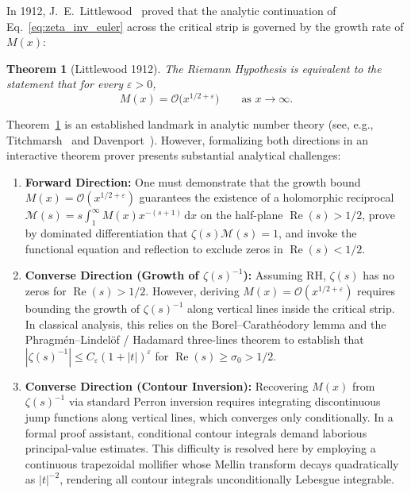 \documentclass[11pt,a4paper]{article}
\newtheorem{theorem}{Theorem}[section]
\theoremstyle{definition}
\newcommand{\dee}{\mathrm{d}}
\begin{document}
In 1912, J.~E.~Littlewood~\cite{Littlewood1912} proved that the analytic continuation of Eq.~\eqref{eq:zeta_inv_euler} across the critical strip is governed by the growth rate of $M(x)$:
\begin{theorem}[Littlewood 1912]
\label{thm:littlewood_classical}
The Riemann Hypothesis is equivalent to the statement that for every $\varepsilon > 0$,
\begin{equation}
\label{eq:littlewood_bound}
M(x) = \mathcal{O}\bigl(x^{1/2+\varepsilon}\bigr) \qquad \text{as } x \to \infty.
\end{equation}
\end{theorem}

Theorem~\ref{thm:littlewood_classical} is an established landmark in analytic number theory (see, e.g., Titchmarsh~\cite[\S14.25--14.26]{Titchmarsh1986} and Davenport~\cite{Davenport1980}). However, formalizing both directions in an interactive theorem prover presents substantial analytical challenges:
\begin{enumerate}[label=(\roman*)]
  \item \textbf{Forward Direction:} One must demonstrate that the growth bound $M(x) = \mathcal{O}(x^{1/2+\varepsilon})$ guarantees the existence of a holomorphic reciprocal $\mathcal{M}(s) = s \int_1^\infty M(x) x^{-(s+1)}\,\dee x$ on the half-plane $\operatorname{Re}(s) > 1/2$, prove by dominated differentiation that $\zeta(s)\mathcal{M}(s) = 1$, and invoke the functional equation and reflection to exclude zeros in $\operatorname{Re}(s) < 1/2$.
  \item \textbf{Converse Direction (Growth of $\zeta(s)^{-1}$):} Assuming RH, $\zeta(s)$ has no zeros for $\operatorname{Re}(s) > 1/2$. However, deriving $M(x) = \mathcal{O}(x^{1/2+\varepsilon})$ requires bounding the growth of $\zeta(s)^{-1}$ along vertical lines inside the critical strip. In classical analysis, this relies on the Borel--Carath\'eodory lemma and the Phragm\'en--Lindel\"of / Hadamard three-lines theorem to establish that $|\zeta(s)^{-1}| \le C_\varepsilon (1 + |t|)^\varepsilon$ for $\operatorname{Re}(s) \ge \sigma_0 > 1/2$.
  \item \textbf{Converse Direction (Contour Inversion):} Recovering $M(x)$ from $\zeta(s)^{-1}$ via standard Perron inversion requires integrating discontinuous jump functions along vertical lines, which converges only conditionally. In a formal proof assistant, conditional contour integrals demand laborious principal-value estimates. This difficulty is resolved here by employing a continuous trapezoidal mollifier whose Mellin transform decays quadratically as $|t|^{-2}$, rendering all contour integrals unconditionally Lebesgue integrable.
\end{enumerate}
\end{document}
